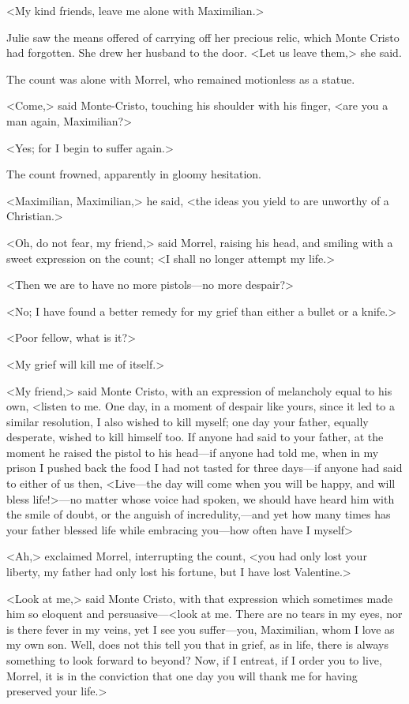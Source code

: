  <My kind friends, leave me alone with Maximilian.> 

 Julie saw the means offered of carrying off her precious relic, which Monte Cristo had forgotten. She drew her husband to the door. <Let us leave them,> she said. 

 The count was alone with Morrel, who remained motionless as a statue. 

 <Come,> said Monte-Cristo, touching his shoulder with his finger, <are you a man again, Maximilian?> 

 <Yes; for I begin to suffer again.> 

 The count frowned, apparently in gloomy hesitation. 

 <Maximilian, Maximilian,> he said, <the ideas you yield to are unworthy of a Christian.> 

 <Oh, do not fear, my friend,> said Morrel, raising his head, and smiling with a sweet expression on the count; <I shall no longer attempt my life.> 

 <Then we are to have no more pistols—no more despair?> 

 <No; I have found a better remedy for my grief than either a bullet or a knife.> 

 <Poor fellow, what is it?> 

 <My grief will kill me of itself.> 

 <My friend,> said Monte Cristo, with an expression of melancholy equal to his own, <listen to me. One day, in a moment of despair like yours, since it led to a similar resolution, I also wished to kill myself; one day your father, equally desperate, wished to kill himself too. If anyone had said to your father, at the moment he raised the pistol to his head—if anyone had told me, when in my prison I pushed back the food I had not tasted for three days—if anyone had said to either of us then, <Live—the day will come when you will be happy, and will bless life!>—no matter whose voice had spoken, we should have heard him with the smile of doubt, or the anguish of incredulity,—and yet how many times has your father blessed life while embracing you—how often have I myself\longdash> 

 <Ah,> exclaimed Morrel, interrupting the count, <you had only lost your liberty, my father had only lost his fortune, but I have lost Valentine.> 

 <Look at me,> said Monte Cristo, with that expression which sometimes made him so eloquent and persuasive—<look at me. There are no tears in my eyes, nor is there fever in my veins, yet I see you suffer—you, Maximilian, whom I love as my own son. Well, does not this tell you that in grief, as in life, there is always something to look forward to beyond? Now, if I entreat, if I order you to live, Morrel, it is in the conviction that one day you will thank me for having preserved your life.> 

